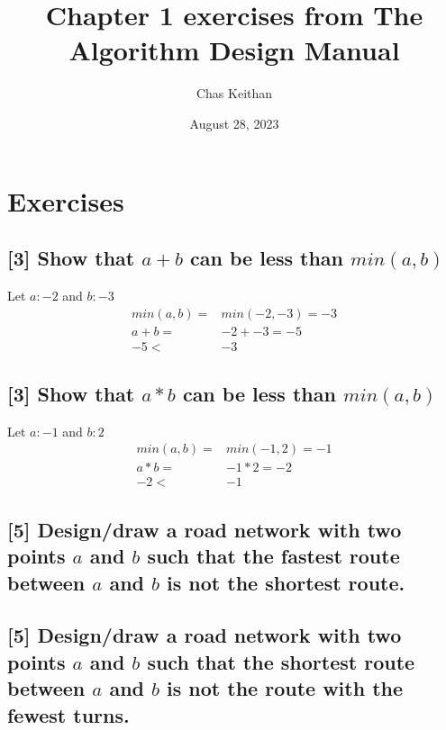 \documentclass[12pt, letterpaper]{article}
\title{Chapter 1 exercises from The Algorithm Design Manual}
\author{Chas Keithan}
\date{August 28, 2023}
\begin{document}
\maketitle
\section{Exercises}
\subsection{[3] Show that $a+b$ can be less than $min(a,b)$}
    Let $a: -2$ and $b: -3$
    \begin{align*}
        min(a, b) =& min(-2,-3) = -3\\
        a + b =& -2 + -3 = -5\\
        -5 <& -3
    \end{align*}
\subsection{[3] Show that $a*b$ can be less than $min(a,b)$}
    Let $a: -1$ and $b: 2$
    \begin{align*}
        min(a ,b) =& min(-1,2) = -1\\
        a * b =& -1 * 2 = -2\\
        -2 <& -1
    \end{align*}
\subsection{[5] Design/draw a road network with two points $a$ and $b$ such that the fastest route between $a$ and $b$ is not the shortest route.}
    \begin{center}
    \end{center}
\subsection{[5] Design/draw a road network with two points $a$ and $b$ such that the shortest route between $a$ and $b$ is not the route with the fewest turns.}
    \begin{center}
    \end{center}
\end{document}
